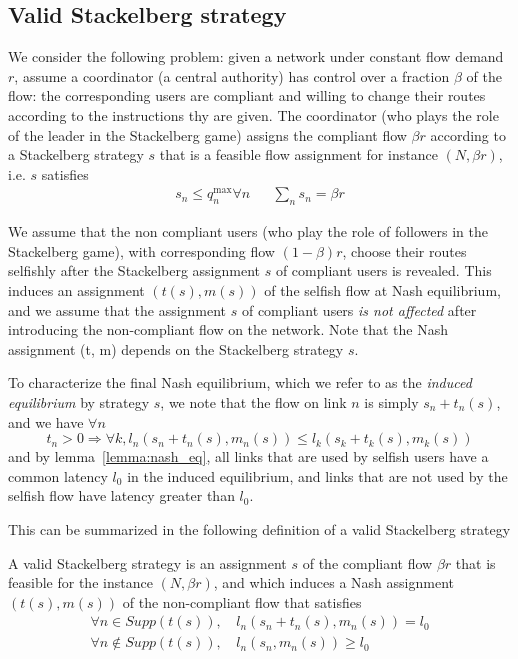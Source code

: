 \subsection{Valid Stackelberg strategy}
We consider the following problem: given a network under constant flow demand $r$, assume a coordinator (a central authority) has control over a fraction $\beta$ of the flow: the corresponding users are compliant and willing to change their routes according to the instructions thy are given. The coordinator (who plays the role of the leader in the Stackelberg game) assigns the compliant flow $\beta r$ according to a Stackelberg strategy $s$ that is a feasible flow assignment for instance $(N, \beta r)$, i.e. $s$ satisfies
\begin{align*}
s_n \leq q_n^{\max} \forall n && \sum_n s_n = \beta r
\end{align*}

We assume that the non compliant users (who play the role of followers in the Stackelberg game), with corresponding flow $(1-\beta)r$, choose their routes selfishly after the Stackelberg assignment $s$ of compliant users is revealed. This induces an assignment $(t(s), m(s))$ of the selfish flow at Nash equilibrium, and we assume that the assignment $s$ of compliant users \emph{is not affected} after introducing the non-compliant flow on the network. Note that the Nash assignment (t, m) depends on the Stackelberg strategy $s$.

To characterize the final Nash equilibrium, which we refer to as the \emph{induced equilibrium} by strategy $s$, we note that the flow on link $n$ is simply $s_n + t_n(s)$, and we have $\forall n$
\[
t_n > 0 \Rightarrow \forall k, l_n \left( s_n + t_n(s), m_n(s) \right) \leq l_k \left( s_k + t_k(s), m_k(s) \right)
\]
and by lemma~\ref{lemma:nash_eq}, all links that are used by selfish users have a common latency $l_0$ in the induced equilibrium, and links that are not used by the selfish flow have latency greater than $l_0$.

This can be summarized in the following definition of a valid Stackelberg strategy


\begin{definition}
A valid Stackelberg strategy is an assignment $s$ of the compliant flow $\beta r$ that is feasible for the instance $(N, \beta r)$, and which induces a Nash assignment $(t(s), m(s))$ of the non-compliant flow that satisfies
\begin{align*}
\forall n \in Supp \left( t(s) \right),\, &l_n \left( s_n + t_n(s), m_n(s) \right) = l_0 \\
\forall n \notin Supp \left( t(s) \right),\, &l_n \left( s_n, m_n(s) \right) \geq l_0
\end{align*}
\end{definition}



